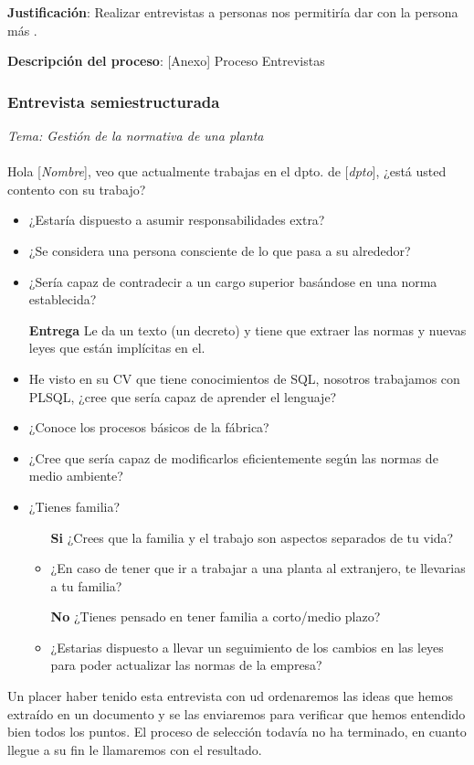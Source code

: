 \documentclass[twoside]{article}
\begin{document}
\textbf{Justificación}: Realizar entrevistas a personas nos permitiría dar con la persona más .

\textbf{Descripción del proceso}: [Anexo] Proceso Entrevistas

\subsubsection{Entrevista semiestructurada}
\textit{Tema: Gestión de la normativa de una planta}\\\\
Hola [\textit{Nombre}], veo que actualmente trabajas en el dpto. de [\textit{dpto}], ¿está usted contento con su trabajo?

\begin{itemize}
	\item ¿Estaría dispuesto a asumir responsabilidades extra?
	\item ¿Se considera una persona consciente de lo que pasa a su alrededor?
	\item ¿Sería capaz de contradecir a un cargo superior basándose en una norma establecida?
	\item[\textbf{Entrega}] Le da un texto (un decreto) y tiene que extraer las normas y nuevas leyes que están implícitas en el.
	\item He visto en su CV que tiene conocimientos de SQL, nosotros trabajamos con PLSQL, ¿cree que sería capaz de aprender el lenguaje?
	\item ¿Conoce los procesos básicos de la fábrica?
	\item ¿Cree que sería capaz de modificarlos eficientemente según las normas de medio ambiente?
	\item ¿Tienes familia?
	\begin{itemize}		
		\item[\textbf{Si}] ¿Crees que la familia y el trabajo son aspectos separados de tu vida?
		\item ¿En caso de tener que ir a trabajar a una planta al extranjero, te llevarias a tu familia?
		\item[\textbf{No}] ¿Tienes pensado en tener familia a corto/medio plazo?
		\item ¿Estarias dispuesto a llevar un seguimiento de los cambios en las leyes para poder actualizar las normas de la empresa?
	\end{itemize}
\end{itemize}
Un placer haber tenido esta entrevista con ud ordenaremos las ideas que hemos extraído en un documento y se las enviaremos para verificar que hemos entendido bien todos los puntos. El proceso de selección todavía no ha terminado, en cuanto llegue a su fin le llamaremos con el resultado.
\end{document}
